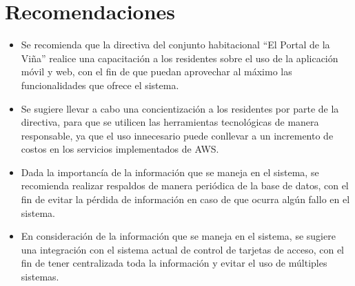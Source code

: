 \section{Recomendaciones}\label{sec:recomendaciones}
\begin{itemize}
    \item Se recomienda que la directiva del conjunto habitacional {\textquotedblleft}El Portal de la Viña{\textquotedblright} realice una capacitación a los residentes sobre el uso de la aplicación móvil y web, con el fin de que puedan aprovechar al máximo las funcionalidades que ofrece el sistema.
    \item Se sugiere llevar a cabo una concientización a los residentes por parte de la directiva, para que se utilicen las herramientas tecnológicas de manera responsable, ya que el uso innecesario puede conllevar a un incremento de costos en los servicios implementados de AWS.
    \item Dada la importancía de la información que se maneja en el sistema, se recomienda realizar respaldos de manera periódica de la base de datos, con el fin de evitar la pérdida de información en caso de que ocurra algún fallo en el sistema.
    \item En consideración de la información que se maneja en el sistema, se sugiere una integración con el sistema actual de control de tarjetas de acceso, con el fin de tener centralizada toda la información y evitar el uso de múltiples sistemas.
\end{itemize}